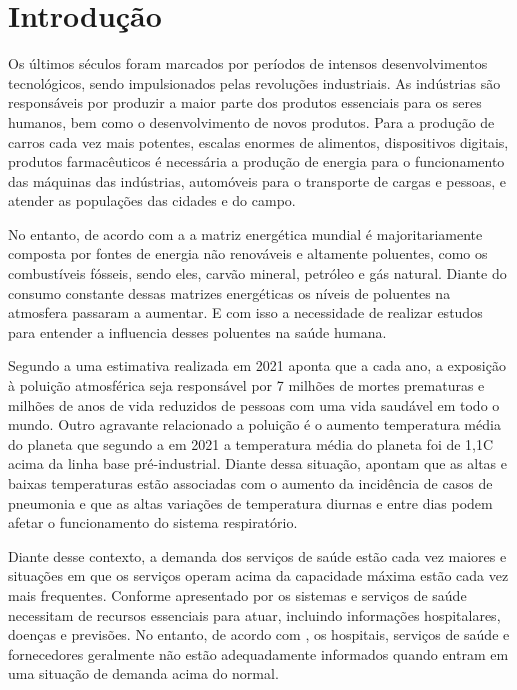 \documentclass[
  12pt,		%
  a4paper,	%
  openright,%
  oneside,	%
  chapter=TITLE,		%
  section=TITLE,		%
  english,	%
  french,	%
  spanish,	%
  brazil	%
]{abntex2}
\begin{document}
    \chapter{Introdução}
    Os últimos séculos foram marcados por períodos de intensos desenvolvimentos tecnológicos, sendo impulsionados
    pelas revoluções industriais. As indústrias são responsáveis por produzir a maior
    parte dos produtos essenciais para os seres humanos, bem como o desenvolvimento de novos produtos.
    Para a produção de carros cada vez mais potentes, escalas enormes de alimentos, dispositivos digitais, produtos farmacêuticos
    é necessária a produção de energia para o funcionamento das máquinas das indústrias, automóveis para o transporte de cargas e pessoas,
    e atender as populações das cidades e do campo.

    No entanto, de acordo com a \cite[]{iea} a matriz energética mundial é majoritariamente
    composta por fontes de energia não renováveis e altamente poluentes, como os combustíveis
    fósseis, sendo eles, carvão mineral, petróleo e gás natural. 
    Diante do consumo constante dessas matrizes energéticas os níveis de poluentes na atmosfera
    passaram a aumentar. E com isso a necessidade de realizar estudos para entender a influencia
    desses poluentes na saúde humana.

    Segundo a \cite[]{diretrizes_oms} uma estimativa realizada em 2021 aponta que a cada ano, a exposição
    à poluição atmosférica seja responsável por 7 milhões de mortes prematuras e milhões de anos de vida
    reduzidos de pessoas com uma vida saudável em todo o mundo. Outro agravante relacionado a poluição é o aumento
    temperatura média do planeta que segundo a \cite[]{temperatura_onu} em 2021 a temperatura média do planeta foi de 1,1\degree C acima
    da linha base pré-industrial. Diante dessa situação, \cite[]{pneumonia_temperatura} apontam que as altas e baixas temperaturas
    estão associadas com o aumento da incidência de casos de pneumonia e que as altas variações de temperatura diurnas e entre dias
    podem afetar o funcionamento do sistema respiratório.

    Diante desse contexto, a demanda dos serviços de saúde estão cada vez maiores e situações em que os serviços operam acima da capacidade
    máxima estão cada vez mais frequentes. Conforme apresentado por \cite[]{Health} os sistemas e serviços de saúde necessitam de recursos essenciais
    para atuar, incluindo informações hospitalares, doenças e previsões. No entanto, de acordo com \cite[]{forcasting_health}, os hospitais, serviços de saúde
    e fornecedores geralmente não estão adequadamente informados quando entram em uma situação de demanda acima do normal.
    
\end{document}
